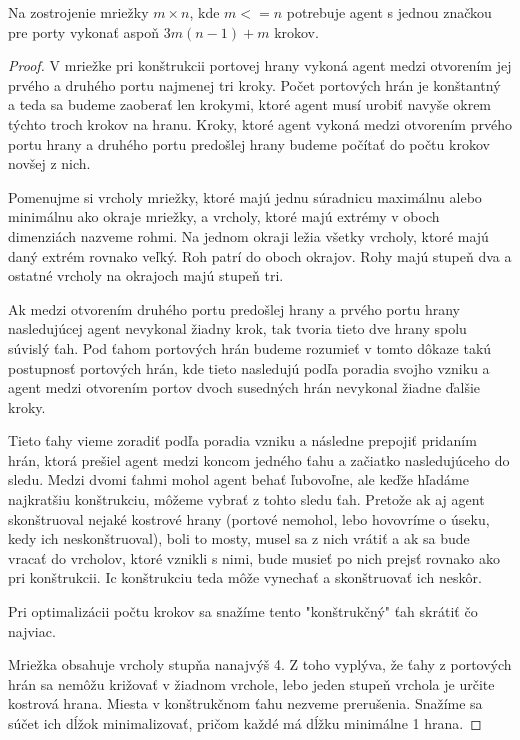 \begin{veta}
Na zostrojenie mriežky $m \times n$, kde $m <=  n$ potrebuje agent s jednou
značkou pre porty vykonať aspoň $3m(n - 1) + m$ krokov.
\end{veta}
\begin{proof}
V mriežke pri konštrukcii portovej hrany vykoná agent medzi otvorením jej
prvého a druhého portu najmenej tri kroky. Počet portových hrán je
konštantný a teda sa budeme zaoberať len krokymi, ktoré agent musí urobiť
navyše okrem týchto troch krokov na hranu. Kroky, ktoré agent vykoná medzi
otvorením prvého portu hrany a druhého portu predošlej hrany budeme počítať
do počtu krokov novšej z nich.

Pomenujme si vrcholy mriežky, ktoré majú jednu súradnicu maximálnu alebo
minimálnu ako okraje mriežky, a vrcholy, ktoré majú extrémy v oboch
dimenziách nazveme rohmi. Na jednom okraji ležia všetky vrcholy, ktoré majú
daný extrém rovnako veľký. Roh patrí do oboch okrajov.
Rohy majú stupeň dva a ostatné vrcholy na okrajoch majú stupeň tri.

Ak medzi otvorením druhého portu predošlej hrany a prvého portu hrany
nasledujúcej agent nevykonal žiadny krok, tak tvoria tieto dve hrany spolu
súvislý ťah. Pod ťahom portových hrán budeme rozumieť v tomto dôkaze takú
postupnosť portových hrán, kde tieto nasledujú podľa poradia svojho vzniku a
agent medzi otvorením portov dvoch susedných hrán nevykonal žiadne ďalšie
kroky.

Tieto ťahy vieme zoradiť podľa poradia vzniku a následne prepojiť pridaním
hrán, ktorá prešiel agent medzi koncom jedného ťahu a začiatko
nasledujúceho do sledu. Medzi dvomi ťahmi mohol agent behať ľubovoľne, ale
keďže hľadáme najkratšiu konštrukciu, môžeme vybrať z tohto sledu ťah.
Pretože ak aj agent skonštruoval nejaké kostrové hrany (portové nemohol,
lebo hovovríme o úseku, kedy ich neskonštruoval), boli to mosty, musel sa z
nich vrátiť a ak sa bude vracať do vrcholov, ktoré vznikli s nimi, bude
musieť po nich prejsť rovnako ako pri konštrukcii. Ic konštrukciu teda môže
vynechať a skonštruovať ich neskôr.

Pri optimalizácii počtu krokov sa snažíme tento "konštrukčný" ťah skrátiť čo
najviac.

Mriežka obsahuje vrcholy stupňa nanajvýš 4. Z toho vyplýva, že ťahy z
portových hrán sa nemôžu križovať v žiadnom vrchole, lebo jeden stupeň
vrchola je určite kostrová hrana. Miesta v konštrukčnom ťahu nezveme
prerušenia. Snažíme sa súčet ich dĺžok minimalizovať, pričom každé má dĺžku
minimálne 1 hrana.


\end{proof}
